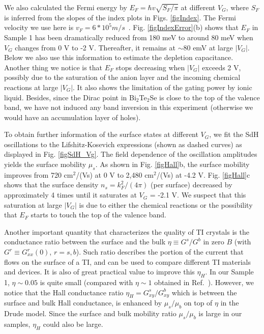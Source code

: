We also calculated the Fermi energy by $E_F=\hbar v \sqrt{S_F/ \pi}$ at different $V_G$, where $S_F$ is inferred from the slopes of the index plots in Figs. \ref{figIndex}. The Fermi velocity we use here is $v_F = 6 * 10^5 m/s$~\cite{Xiong2012}. Fig. \ref{figIndexError}(b) shows that $E_F$ in Sample 1 has been dramatically reduced from 180 meV to around 80 meV when $V_G$ changes from 0 V to -2 V. Thereafter, it remains at $\sim80$ emV at large $|V_G|$. Below we also use this information to estimate the depletion capacitance. Another thing we notice is that $E_F$ stops decreasing when $|V_G|$ exceeds 2 V, possibly due to the saturation of the anion layer and the incoming chemical reactions at large $|V_G|$. It also shows the limitation of the gating power by ionic liquid. Besides, since the Dirac point in Bi$_2$Te$_2$Se is close to the top of the valence band, we have not induced any band inversion in this experiment (otherwise we would have an accumulation layer of holes).

To obtain further information of the surface states at different $V_G$, we fit the SdH oscillations to the Lifshitz-Kosevich expressions (shown as dashed curves) as displayed in Fig. \ref{figSdH_Vg}. The field dependence of the oscillation amplitudes yields the surface mobility $\mu_s$. As shown in Fig. \ref{figHall}b, the surface mobility improves from 720 cm$^2$/(Vs) at 0 V to 2,480 cm$^2$/(Vs) at -4.2 V. Fig. \ref{figHall}c shows that the surface density $n_s = k_F^2/(4\pi)$ (per surface) decreased by approximately 4 times until it saturates at $V_G$ = -2.1 V. We suspect that this saturation at large $|V_G|$ is due to either the chemical reactions or the possibility that $E_F$ starts to touch the top of the valence band.

Another important quantity that characterizes the quality of TI crystals is the conductance ratio between the surface and the bulk $\eta \equiv G^s/G^b$ in zero $B$ (with $G^r \equiv G^r_{xx}(0)$, $r=s,b$). Such ratio describes the portion of the current that flows on the surface of a TI, and can be used to compare different TI materials and devices. It is also of great practical value to improve this $\eta_H$. In our Sample 1, $\eta\sim 0.05$ is quite small (compared with $\eta\sim 1$ obtained in Ref.~\cite{Xiong2012}). However, we notice that the Hall conductance ratio $\eta_H = G^s_{xy}/G^b_{xy}$ which is between the surface and bulk Hall conductance, is enhanced by $\mu_s/\mu_b$ on top of $\eta$ in the Drude model. Since the surface and bulk mobility ratio $\mu_s/\mu_b$ is large in our samples, $\eta_H$ could also be large. 



